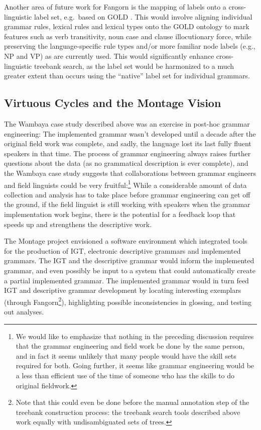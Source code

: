 \documentclass[12pt]{article}
\begin{document}
Another area of future work for Fangorn is the mapping of labels
onto a cross-linguistic label set, e.g.\ based on GOLD
\cite{Farrar:Lewis:2007}. This would involve aligning individual grammar
rules, lexical rules and lexical types onto the GOLD ontology to mark
features such as verb transitivity, noun case and clause illocutionary
force, while preserving the language-specific rule types and/or more
familiar node labels (e.g., {\small NP} and {\small VP}) as are 
currently used. This would significantly enhance cross-linguistic
treebank search, as the label set would be harmonized to a much greater
extent than occurs using the ``native'' label set for individual
grammars.


\subsection{Virtuous Cycles and the Montage Vision} 

The Wambaya case study described above was an exercise in post-hoc
grammar engineering: The implemented grammar wasn't developed until a
decade after the original field work was complete, and sadly, the
language lost its last fully fluent speakers in that time.  The process
of grammar engineering always raises further questions about the data
(as no grammatical description is ever complete), and the Wambaya case
study suggests that collaborations between grammar engineers and field
linguists could be very fruitful:\footnote{We would like to emphasize that nothing in the
  preceding discussion requires that the grammar engineering and field
  work be done by the same person, and in fact it seems unlikely that many
  people would have the skill sets required for both. Going further,
  it seems like grammar engineering would be a less than efficient use
  of the time of someone who has the skills to do original fieldwork.}
While a considerable amount of data collection and analysis has to
take place before grammar engineering can get off the ground, if the
field linguist is still working with speakers when the grammar
implementation work begins, there is the potential for a feedback loop
that speeds up and strengthens the descriptive work.

The Montage project \cite{Ben:Fli:Goo:Sag:04} envisioned a software
environment which integrated tools for the production of IGT,
electronic descriptive grammars and implemented grammars.  The IGT and
the descriptive grammar would inform the implemented grammar, and even
possibly be input to a system that could automatically create a
partial implemented grammar. The implemented grammar would in turn
feed IGT and descriptive grammar development by locating interesting
exemplars (through Fangorn\footnote{Note that this could even
  be done before the manual annotation step of the treebank
  construction process: the treebank search tools described above work
  equally with undisambiguated sets of trees.}), highlighting
possible inconsistencies in glossing, and testing out analyses.
\end{document}
